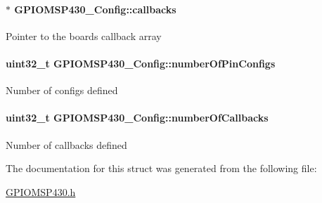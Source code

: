 \paragraph[{callbacks}]{$\ast$ G\+P\+I\+O\+M\+S\+P430\+\_\+\+Config\+::callbacks}\label{struct_g_p_i_o_m_s_p430___config_a3d8366dde66ac98a9d22c0d739a2aa2d}
Pointer to the board\textquotesingle{}s callback array 
\paragraph[{number\+Of\+Pin\+Configs}]{\setlength{\rightskip}{0pt plus 5cm}uint32\+\_\+t G\+P\+I\+O\+M\+S\+P430\+\_\+\+Config\+::number\+Of\+Pin\+Configs}\label{struct_g_p_i_o_m_s_p430___config_a4c7d4c27deac044a06e0f38158f59c71}
Number of configs defined 
\paragraph[{number\+Of\+Callbacks}]{\setlength{\rightskip}{0pt plus 5cm}uint32\+\_\+t G\+P\+I\+O\+M\+S\+P430\+\_\+\+Config\+::number\+Of\+Callbacks}\label{struct_g_p_i_o_m_s_p430___config_aee73401132265aaad2c10da512093104}
Number of callbacks defined 

The documentation for this struct was generated from the following file\+:\begin{DoxyCompactItemize}
\item 
\hyperlink{_g_p_i_o_m_s_p430_8h}{G\+P\+I\+O\+M\+S\+P430.\+h}\end{DoxyCompactItemize}
